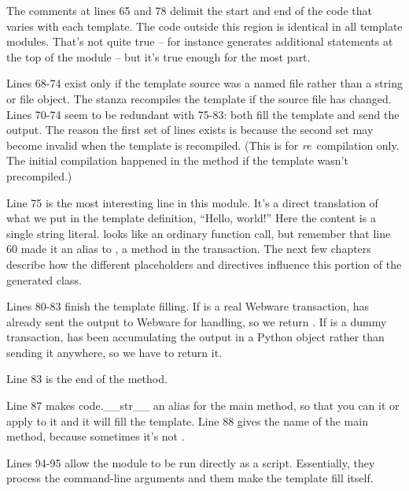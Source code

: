 The comments at lines 65 and 78 delimit the start and end of the code that
varies with each template.  The code outside this region is identical in all
template modules.  That's not quite true --  for instance
generates additional  statements at the top of the module --
but it's true enough for the most part.

Lines 68-74 exist only if the template source was a named file rather than
a string or file object.  The stanza recompiles the template if the source
file has changed.  Lines 70-74 seem to be redundant with 75-83: both 
fill the template and send the output.  The reason the first set of lines
exists is because the second set may become invalid when the template is
recompiled.  (This is for {\em re}\ compilation only.  The initial compilation
happened in the  method if the template wasn't 
precompiled.)

Line 75 is the most interesting line in this module.  It's a direct
translation of what we put in the template definition, ``Hello, world!'' Here
the content is a single string literal.   looks like an ordinary
function call, but remember that line 60 made it an alias to
, a method in the transaction.  The next few
chapters describe how the different placeholders and directives influence this
portion of the generated class.

Lines 80-83 finish the template filling.  If  is a real Webware
transaction,  has already sent the output to Webware for handling,
so we return .  If  is a dummy transaction, 
 has been accumulating the output in a Python 
object rather than sending it anywhere, so we have to return it.

Line 83 is the end of the  method.

Line 87 makes code{.\_\_str\_\_} an alias for the main method, so that you
can  it or apply  to it and it will fill the template.
Line 88 gives the name of the main method, because sometimes it's not
.  

Lines 94-95 allow the module to be run directly as a script.  Essentially,
they process the command-line arguments and them make the template fill
itself.


